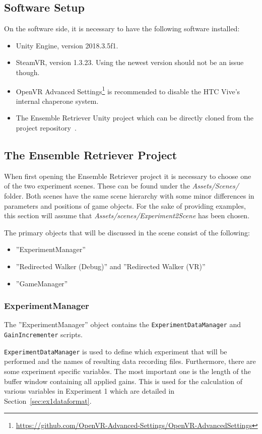 \subsection{Software Setup}
On the software side, it is necessary to have the following software installed:
\begin{itemize}
    \item Unity Engine, version 2018.3.5f1.
    \item SteamVR, version 1.3.23. Using the newest version should not be an issue though. 
    \item OpenVR Advanced Settings\footnote{\url{https://github.com/OpenVR-Advanced-Settings/OpenVR-AdvancedSettings}} is recommended to disable the HTC Vive's internal chaperone system.
    \item The Ensemble Retriever Unity project which can be directly cloned from the project repository~\cite{projectRepository}.
\end{itemize}

\subsection{The Ensemble Retriever Project}\label{sec:ensembleRetrieverReproInfo}
When first opening the Ensemble Retriever project it is necessary to choose one of the two experiment scenes. These can be found under the \emph{Assets/Scenes/} folder. Both scenes have the same scene hierarchy with some minor differences in parameters and positions of game objects. For the sake of providing examples, this section will assume that \emph{Assets/scenes/Experiment2Scene} has been chosen. 

The primary objects that will be discussed in the scene consist of the following:
\begin{itemize}
    \item ''ExperimentManager''
    \item ''Redirected Walker (Debug)'' and ''Redirected Walker (VR)''
    \item ''GameManager''
\end{itemize}

\subsubsection{ExperimentManager}
The ''ExperimentManager'' object contains the \lstinline{ExperimentDataManager} and \lstinline{GainIncrementer} scripts. 

\lstinline{ExperimentDataManager} is used to define which experiment that will be performed and the names of resulting data recording files. Furthermore, there are some experiment specific variables. The most important one is the length of the buffer window containing all applied gains. This is used for the calculation of various variables in Experiment 1 which are detailed in Section~\ref{sec:ex1dataformat}.

